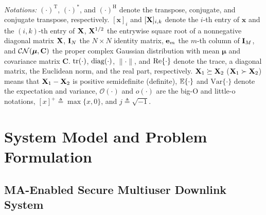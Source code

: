 \documentclass[journal]{IEEEtran}
\begin{document}
\textit{Notations:} $(\cdot)^{\mathrm T}$, $(\cdot)^*$, and $(\cdot)^{\mathrm H}$ denote the transpose, conjugate, and conjugate transpose, respectively. $[\mathbf x]_i$ and $[\mathbf{X}]_{i,k}$ denote the $i$-th entry of $\mathbf x$ and the $(i,k)$-th entry of $\mathbf{X}$, $\mathbf{X}^{1/2}$ the entrywise square root of a nonnegative diagonal matrix $\mathbf{X}$, $\mathbf{I}_N$ the $N\times N$ identity matrix, $\mathbf{e}_m$ the $m$-th column of $\mathbf{I}_M$, and $\mathcal{CN}(\boldsymbol\mu,\mathbf C)$ the proper complex Gaussian distribution with mean $\boldsymbol\mu$ and covariance matrix $\mathbf C$. $\mathrm{tr}(\cdot)$, $\mathrm{diag}(\cdot)$, $\|\cdot\|$, and $\mathrm{Re}\{\cdot\}$ denote the trace, a diagonal matrix, the Euclidean norm, and the real part, respectively. $\mathbf{X}_1\succeq\mathbf{X}_2$ ($\mathbf{X}_1\succ\mathbf{X}_2$) means that $\mathbf{X}_1-\mathbf{X}_2$ is positive semidefinite (definite), $\mathbb{E}\{\cdot\}$ and $\mathrm{Var}\{\cdot\}$ denote the expectation and variance, $\mathcal O(\cdot)$ and $o(\cdot)$ are the big-O and little-o notations, $[x]^+\triangleq\max\{x,0\}$, and $j\triangleq\sqrt{-1}$.

\section{System Model and Problem Formulation}\label{sec:model}

\subsection{MA-Enabled Secure Multiuser Downlink System}
\end{document}
